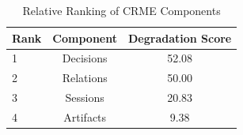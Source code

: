 \begin{table}[htbp]
\centering
\caption{Relative Ranking of CRME Components}
\label{tab:crme-component-ranking-paper}
\begin{tabular}{lcc}
\toprule
Rank & Component & Degradation Score \\
\midrule
1 & Decisions & 52.08 \\
2 & Relations & 50.00 \\
3 & Sessions & 20.83 \\
4 & Artifacts & 9.38 \\
\bottomrule
\end{tabular}
\end{table}